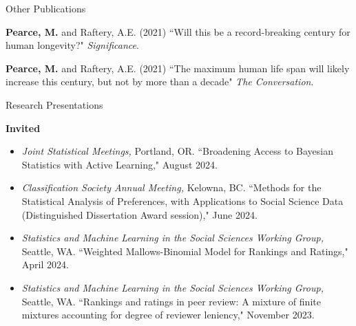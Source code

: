 \documentclass{resume} %
\begin{document}
\begin{rSection}{Other Publications}

\textbf{Pearce, M.} and Raftery, A.E. (2021) ``Will this be a record-breaking century for human longevity?" {\em Significance}.

\textbf{Pearce, M.} and Raftery, A.E. (2021) ``The maximum human life span will likely increase this century, but not by more than a decade" {\em The Conversation}.

\end{rSection}

\begin{rSection}{Research Presentations}

\textbf{Invited}
\begin{itemize}
\item \textit{Joint Statistical Meetings,} Portland, OR. ``Broadening Access to Bayesian Statistics with Active Learning," August 2024.
\item \textit{Classification Society Annual Meeting,} Kelowna, BC. ``Methods for the Statistical Analysis of Preferences, with Applications to Social Science Data (Distinguished Dissertation Award session)," June 2024.
\item \textit{Statistics and Machine Learning in the Social Sciences Working Group,} Seattle, WA. ``Weighted Mallows-Binomial Model for Rankings and Ratings," April 2024.
\item \textit{Statistics and Machine Learning in the Social Sciences Working Group,} Seattle, WA. ``Rankings and ratings in peer review: A mixture of finite mixtures accounting for degree of reviewer leniency," November 2023.
\end{itemize}


\end{rSection}
\end{document}
